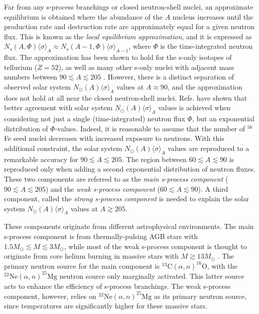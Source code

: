 Far from any s-process branchings or closed neutron-shell nuclei, an approximate equilibrium is obtained where the abundance of the $A$ nucleus increases until the production rate and destruction rate are approximately equal for a given neutron flux. This is known as the \emph{local equilibrium approximation}, and it is expressed as $N_{s}(A,\Phi)\langle \sigma \rangle_{A} \approx N_{s}(A-1,\Phi)\langle \sigma \rangle_{A-1}$, where $\Phi$ is the time-integrated neutron flux. The approximation has been shown to hold for the s-only isotopes of tellurium ($Z=52$), as well as many other s-only nuclei with adjacent mass numbers between $90 \lesssim A \lesssim 205$ \cite{Iliadis2015}. However, there is a distinct separation of observed solar system $N_{\odot}(A)\langle \sigma \rangle_{A}$ values at $A \approx 90$, and the approximation does not hold at all near the closed neutron-shell nuclei. Refs. \cite{Clayton1961,Seeger1965} have shown that better agreement with solar system $N_{\odot}(A)\langle \sigma \rangle_{A}$ values is achieved when considering not just a single (time-integrated) neutron flux $\Phi$, but an exponential distribution of $\Phi$-values. Indeed, it is reasonable to assume that the number of $^{56}$Fe seed nuclei decreases with increased exposure to neutrons. With this additional constraint, the solar system $N_{\odot}(A)\langle \sigma \rangle_{A}$ values are reproduced to a remarkable accuracy for $90 \lesssim A \lesssim 205$. The region between $60 \lesssim A \lesssim 90$ is reproduced only when adding a second exponential distribution of neutron fluxes. These two components are referred to as the \emph{main s-process component} ($90 \lesssim A \lesssim 205$) and the \emph{weak s-process component} ($60 \lesssim A \lesssim 90$). A third component, called the \emph{strong s-process component} is needed to explain the solar system $N_{\odot}(A)\langle \sigma \rangle_{A}$ values at $A \gtrsim 205$. 



These components originate from different astrophysical environments. The main s-process component is from thermally-pulsing AGB stars with $1.5 M_{\odot} \lesssim M \lesssim 3 M_{\odot}$, while most of the weak s-process component is thought to originate from core helium burning in massive stars with $M \gtrsim 13 M_{\odot}$ \cite{Iliadis2015}. The primary neutron source for the main component is $^{13}\mathrm{C}(\alpha,n)^{16}\mathrm{O}$, with the $^{22}\mathrm{Ne}(\alpha,n)^{25}\mathrm{Mg}$ neutron source only marginally activated. This latter source acts to enhance the efficiency of s-process branchings. The weak s-process component, however, relies on $^{22}\mathrm{Ne}(\alpha,n)^{25}\mathrm{Mg}$ as its primary neutron source, since temperatures are significantly higher for these massive stars.

